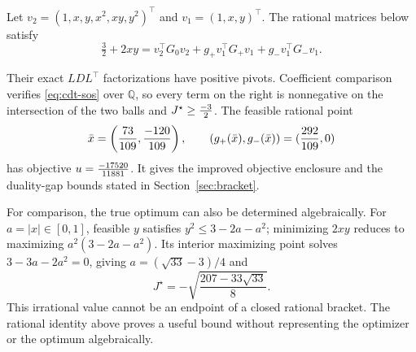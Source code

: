 \documentclass[11pt]{article}
\newcommand{\Q}{\mathbb{Q}}
\theoremstyle{plain}
\theoremstyle{remark}
\begin{document}
Let $v_2=(1,x,y,x^2,xy,y^2)^\top$ and $v_1=(1,x,y)^\top$.
The rational matrices below satisfy
\begin{equation}
\tfrac32+2xy
=v_2^\top G_0v_2+g_+v_1^\top G_+v_1+g_-v_1^\top G_-v_1.
\label{eq:cdt-sos}
\end{equation}

Their exact $LDL^\top$ factorizations have positive pivots. Coefficient
comparison verifies \eqref{eq:cdt-sos} over $\Q$, so every term on the right is
nonnegative on the intersection of the two balls and $J^\star\ge\frac{-3}{2}$. The feasible rational
point
\[
\bar x=\left(\frac{73}{109},\frac{-120}{109}\right),\qquad
(g_+(\bar x),g_-(\bar x))=(\frac{292}{109},0)
\]
has objective $u=\frac{-17520}{11881}$. It gives the improved objective enclosure and the
duality-gap bounds stated in Section~\ref{sec:bracket}.

For comparison, the true optimum can also be determined algebraically.
For $a=|x|\in[0,1]$, feasible $y$ satisfies $y^2\le3-2a-a^2$; minimizing
$2xy$ reduces to maximizing $a^2(3-2a-a^2)$. Its interior maximizing point
solves $3-3a-2a^2=0$, giving $a=(\sqrt{33}-3)/4$ and
\[
J^\star=-\sqrt{\frac{207-33\sqrt{33}}8}.
\]
This irrational value cannot be an endpoint of a closed rational bracket.
The rational identity above proves a useful bound without representing the
optimizer or the optimum algebraically.



\end{document}
